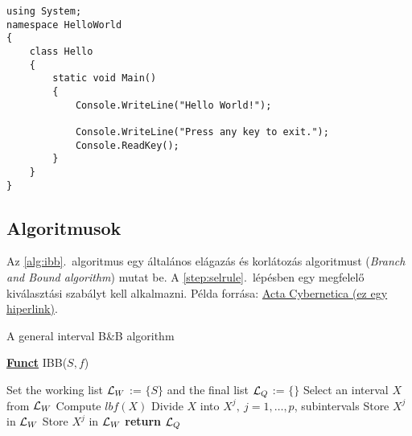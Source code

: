 \begin{lstlisting}[language={[Sharp]C}]
using System;
namespace HelloWorld
{
	class Hello 
	{
		static void Main() 
		{
			Console.WriteLine("Hello World!");
			
			Console.WriteLine("Press any key to exit.");
			Console.ReadKey();
		}
	}
}
\end{lstlisting}

\subsection{Algoritmusok}

Az \ref{alg:ibb}.~algoritmus egy általános elágazás és korlátozás algoritmust (\emph{Branch and Bound algorithm}) mutat be. A \ref{step:selrule}.~lépésben egy megfelelő kiválasztási szabályt kell alkalmazni.
Példa forrása: \href{https://www.inf.u-szeged.hu/actacybernetica/}{Acta Cybernetica (ez egy hiperlink)}.

\begin{algorithm}[H]
\caption{A general interval B\&B algorithm}
\label{alg:ibb}
\textbf{\underline{Funct}} IBB($S,f$)
\begin{algorithmic}[1] %
\State Set the working list ${\cal L}_W$ := $\{S\}$ and the final list ${\cal L}_Q$ := $\{\}$
 \label{alg:igoend}
	\State Select an interval $X$ from ${\cal L}_W$ \label{step:selrule}
	\State Compute $lbf(X)$ 
	 
		\State Divide $X$ into $X^j,\ j=1,\dots, p$, subintervals   
			 
				\State Store $X^j$ in ${\cal L}_W$
			\Else
				\State Store $X^j$ in ${\cal L}_W$
			\EndIf
		\EndFor
	\EndIf
\EndWhile
\State \textbf{return} ${\cal L}_Q$
\end{algorithmic}
\end{algorithm}
